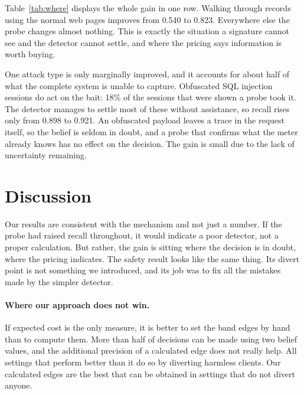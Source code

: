 \documentclass[runningheads]{llncs}
\begin{document}
Table~\ref{tab:where} displays the whole gain in one row. Walking through records using
the normal web pages improves from 0.540 to 0.823. Everywhere else the probe changes
almost nothing. This is exactly the situation a signature cannot see and the detector
cannot settle, and where the pricing says information is worth buying.

One attack type is only marginally improved, and it accounts for about half of what the
complete system is unable to capture. Obfuscated SQL injection sessions do act on the
bait: 18\% of the sessions that were shown a probe took it. The detector manages to
settle most of these without assistance, so recall rises only from 0.898 to 0.921. An
obfuscated payload leaves a trace in the request itself, so the belief is seldom in
doubt, and a probe that confirms what the meter already knows has no effect on the
decision. The gain is small due to the lack of uncertainty remaining.



\section{Discussion}
\label{sec:discussion}

Our results are consistent with the mechanism and not just a number. If the probe had raised recall throughout, it would indicate a poor detector, not a proper calculation. But rather, the gain is sitting where the decision is in doubt, where the pricing indicates. The safety result looks like the same thing. Its divert point is not something we introduced, and its job was to fix all the mistakes made by the simpler detector.

\paragraph{Where our approach does not win.} If expected cost is the only measure, it is better to set the band edges by hand than to compute them. More than half of decisions can be made using two belief values, and the additional precision of a calculated edge does not really help. All settings that perform better than it do so by diverting harmless clients. Our calculated edges are the best that can be obtained in settings that do not divert anyone.
\end{document}
